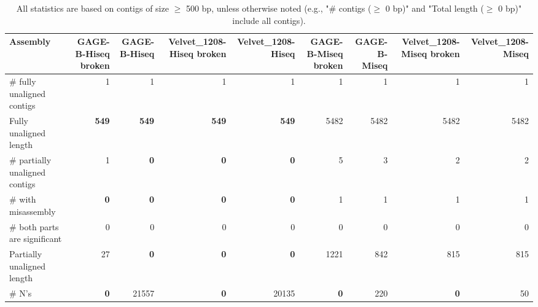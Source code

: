 \documentclass[12pt,a4paper]{article}
\begin{document}
\begin{table}[ht]
\begin{center}
\caption{All statistics are based on contigs of size $\geq$ 500 bp, unless otherwise noted (e.g., "\# contigs ($\geq$ 0 bp)" and "Total length ($\geq$ 0 bp)" include all contigs).}
\begin{tabular}{|l*{8}{|r}|}
\hline
Assembly & GAGE-B-Hiseq broken & GAGE-B-Hiseq & Velvet\_1208-Hiseq broken & Velvet\_1208-Hiseq & GAGE-B-Miseq broken & GAGE-B-Miseq & Velvet\_1208-Miseq broken & Velvet\_1208-Miseq \\ \hline
\# fully unaligned contigs & 1 & 1 & 1 & 1 & 1 & 1 & 1 & 1 \\ \hline
Fully unaligned length & {\bf 549} & {\bf 549} & {\bf 549} & {\bf 549} & 5482 & 5482 & 5482 & 5482 \\ \hline
\# partially unaligned contigs & 1 & {\bf 0} & {\bf 0} & {\bf 0} & 5 & 3 & 2 & 2 \\ \hline
\hspace{5mm}\# with misassembly & {\bf 0} & {\bf 0} & {\bf 0} & {\bf 0} & 1 & 1 & 1 & 1 \\ \hline
\hspace{5mm}\# both parts are significant & 0 & 0 & 0 & 0 & 0 & 0 & 0 & 0 \\ \hline
Partially unaligned length & 27 & {\bf 0} & {\bf 0} & {\bf 0} & 1221 & 842 & 815 & 815 \\ \hline
\# N's & {\bf 0} & 21557 & {\bf 0} & 20135 & {\bf 0} & 220 & {\bf 0} & 50 \\ \hline
\end{tabular}
\end{center}
\end{table}
\end{document}
